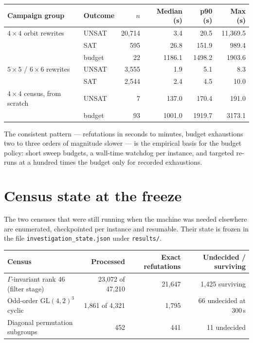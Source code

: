\documentclass[11pt]{article}
\newcommand{\GL}{\mathrm{GL}}
\begin{document}
\begin{center}
\begin{tabular}{llrrrr}
\toprule
Campaign group & Outcome & $n$ & Median (s) & p90 (s) & Max (s) \\
\midrule
$4\times4$ orbit rewrites & UNSAT & 20{,}714 & 3.4 & 20.5 & 11{,}369.5 \\
                          & SAT & 595 & 26.8 & 151.9 & 989.4 \\
                          & budget & 22 & 1186.1 & 1498.2 & 1903.6 \\
$5\times5$ / $6\times6$ rewrites & UNSAT & 3{,}555 & 1.9 & 5.1 & 8.3 \\
                          & SAT & 2{,}544 & 2.4 & 4.5 & 10.0 \\
$4\times4$ census, from scratch & UNSAT & 7 & 137.0 & 170.4 & 191.0 \\
                          & budget & 93 & 1001.0 & 1919.7 & 3173.1 \\
\bottomrule
\end{tabular}
\end{center}

The consistent pattern --- refutations in seconds to minutes, budget exhaustions two to three orders of
magnitude slower --- is the empirical basis for the budget policy: short sweep budgets, a wall-time
watchdog per instance, and targeted re-runs at a hundred times the budget only for recorded exhaustions.

\section{Census state at the freeze}

The two censuses that were still running when the machine was needed elsewhere are enumerated,
checkpointed per instance and resumable. Their state is frozen in the file
\texttt{investigation\_state.json} under \texttt{results/}.

\begin{center}
\begin{tabular}{lrrr}
\toprule
Census & Processed & Exact refutations & Undecided / surviving \\
\midrule
$\Gamma$-invariant rank 46 (filter stage) & 23{,}072 of 47{,}210 & 21{,}647 & 1{,}425 surviving \\
Odd-order $\GL(4,2)^3$ cyclic & 1{,}861 of 4{,}321 & 1{,}795 & 66 undecided at 300\,s \\
Diagonal permutation subgroups & 452 & 441 & 11 undecided \\
\bottomrule
\end{tabular}
\end{center}
\end{document}
